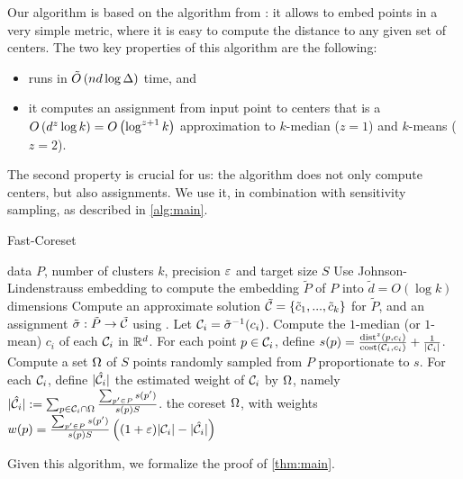 Our algorithm is based on the \fkmeans algorithm from \cite{cohen2020fast}: it allows to embed points in a very simple metric,  where it is easy to compute the
distance to any given set of centers. The two key properties of this algorithm are the following: 
\begin{itemize}
\item \fkmeans runs in $\tilde O\left( n d \log \Delta\right)$ time, and
\item it computes an assignment from input point to centers that is a $O\left( d^z \log k\right) = O\left(\log^{z+1} k\right)$ approximation to $k$-median ($z=1$) and
$k$-means ($z=2$).
\end{itemize}

The second property is crucial for us: the algorithm does not only compute centers, but also assignments. 
  We use it, in combination with sensitivity sampling, as described in \cref{alg:main}.


\begin{algorithm}[tb]
   \caption{Fast-Coreset}
   \label{alg:main}
\begin{algorithmic}
    data $P$, number of clusters $k$, precision $\varepsilon$ and target size $S$
   \STATE Use Johnson-Lindenstrauss embedding to compute the embedding $\tilde P$ of $P$ into $\tilde d = O(\log k)$ dimensions
   \STATE Compute an approximate solution $\tilde {\mathcal C} = \left\{ \tilde c_1, ..., \tilde c_k\right\} $ for $\tilde P$, and an assignment $\tilde \sigma : \tilde P \rightarrow \tilde {\mathcal C}$ using \fkmeans.	
   \STATE Let $\mathcal C_i = \tilde \sigma^{-1}(c_i)$.
   \STATE Compute the $1$-median (or $1$-mean) $c_i$ of each $\mathcal C_i$ in $\mathbb{R}^d$.%
   \STATE For each point $p \in \mathcal C_i$, define
   $s(p) = \frac{\operatorname{dist}^z(p, c_i)}{\operatorname{cost}(\mathcal C_i, c_i)}+ \frac{1}{|\mathcal C_i|}$.
   \STATE Compute a set $\Omega$ of $S$ points randomly sampled from $P$ proportionate to $s$.
   \STATE For each $\mathcal C_i$, define $|\hat {\mathcal C}_i|$ the estimated weight of $\mathcal C_i$ by $\Omega$, namely $|\hat {\mathcal C}_i| := \sum_{p \in \mathcal C_i \cap \Omega} \frac{\sum_{p' \in P}s(p')}{s(p)S}$.
    the coreset $\Omega$, with weights $w(p) = \frac{\sum_{p' \in P}s(p')}{s(p)S} \left( (1+\varepsilon)|\mathcal C_i| - |\hat {\mathcal C}_i|\right)$
\end{algorithmic}
\end{algorithm}


Given this algorithm, we formalize the proof of \cref{thm:main}.

